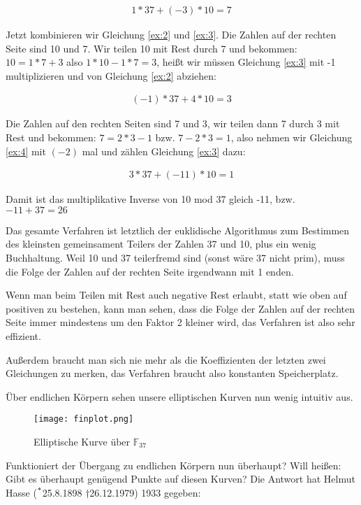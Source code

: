 \documentclass{article}
\newcommand{\F}{\mathbb{F}}
\newcounter{thm}
\begin{document}
\begin{eqnarray}
    1 *37 + (-3) * 10 = 7 \label{ex:3}
\end{eqnarray}

Jetzt kombinieren wir Gleichung \eqref{ex:2} und \eqref{ex:3}.
Die Zahlen auf der rechten Seite
sind 10 und 7. Wir teilen 10 mit Rest durch 7 und bekommen: $10 = 1 * 7 + 3$
also $1 * 10 - 1 * 7 = 3$, heißt wir müssen Gleichung \eqref{ex:3} mit -1
multiplizieren und von Gleichung \eqref{ex:2} abziehen:

\begin{eqnarray}
    (-1) * 37 + 4 * 10 = 3 \label{ex:4}
\end{eqnarray}

Die Zahlen auf den rechten Seiten sind 7 und 3, wir teilen dann 7 durch 3 mit
Rest und bekommen: $7 = 2*3 - 1$ bzw. $7 - 2*3 = 1$, also nehmen wir Gleichung
\eqref{ex:4} mit $(-2)$ mal und zählen Gleichung \eqref{ex:3} dazu:

\begin{eqnarray}
    3 * 37 + (-11) * 10 = 1
\end{eqnarray}

Damit ist das multiplikative Inverse von 10 mod 37 gleich -11, bzw. $-11 + 37
= 26$

Das gesamte Verfahren ist letztlich der euklidische Algorithmus zum Bestimmen
des kleinsten gemeinsament Teilers der Zahlen 37 und 10, plus ein wenig
Buchhaltung. Weil 10 und 37 teilerfremd sind (sonst wäre 37 nicht prim), muss
die Folge der Zahlen auf der rechten Seite irgendwann mit 1 enden.

Wenn man beim Teilen mit Rest auch negative Rest erlaubt, statt wie oben auf
positiven zu bestehen, kann man sehen, dass die Folge der Zahlen auf der
rechten Seite immer mindestens um den Faktor 2 kleiner wird, das Verfahren ist
also sehr effizient.

Außerdem braucht man sich nie mehr als die Koeffizienten der letzten zwei
Gleichungen zu merken, das Verfahren braucht also konstanten Speicherplatz.
\pagebreak


Über endlichen Körpern sehen unsere elliptischen Kurven nun wenig intuitiv
aus.
\begin{figure}[h]
  \centering
  \texttt{[image: finplot.png]}
  \caption{Elliptische Kurve über $\F_{37}$}
\end{figure}

Funktioniert der Übergang zu endlichen Körpern nun überhaupt? Will heißen:
Gibt es überhaupt genügend Punkte auf diesen Kurven? Die Antwort hat Helmut
Hasse ($\strut^*$25.8.1898  $\dagger$26.12.1979) 1933 gegeben:
\end{document}
